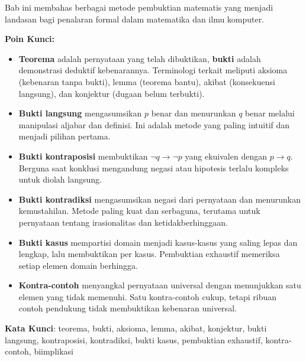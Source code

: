 \documentclass[../main]{subfiles}
\begin{document}
\begin{rangkuman}
Bab ini membahas berbagai metode pembuktian matematis yang menjadi landasan bagi penalaran formal dalam matematika dan ilmu komputer.

\textbf{Poin Kunci:}
\begin{itemize}
  \item \textbf{Teorema} adalah pernyataan yang telah dibuktikan, \textbf{bukti} adalah demonstrasi deduktif kebenarannya. Terminologi terkait meliputi aksioma (kebenaran tanpa bukti), lemma (teorema bantu), akibat (konsekuensi langsung), dan konjektur (dugaan belum terbukti).
  \item \textbf{Bukti langsung} mengasumsikan $p$ benar dan menurunkan $q$ benar melalui manipulasi aljabar dan definisi. Ini adalah metode yang paling intuitif dan menjadi pilihan pertama.
  \item \textbf{Bukti kontraposisi} membuktikan $\neg q \rightarrow \neg p$ yang ekuivalen dengan $p \rightarrow q$. Berguna saat konklusi mengandung negasi atau hipotesis terlalu kompleks untuk diolah langsung.
  \item \textbf{Bukti kontradiksi} mengasumsikan negasi dari pernyataan dan menurunkan kemustahilan. Metode paling kuat dan serbaguna, terutama untuk pernyataan tentang irasionalitas dan ketidakberhinggaan.
  \item \textbf{Bukti kasus} mempartisi domain menjadi kasus-kasus yang saling lepas dan lengkap, lalu membuktikan per kasus. Pembuktian exhaustif memeriksa setiap elemen domain berhingga.
  \item \textbf{Kontra-contoh} menyangkal pernyataan universal dengan menunjukkan satu elemen yang tidak memenuhi. Satu kontra-contoh cukup, tetapi ribuan contoh pendukung tidak membuktikan kebenaran universal.
\end{itemize}

\textbf{Kata Kunci}: teorema, bukti, aksioma, lemma, akibat, konjektur, bukti langsung, kontraposisi, kontradiksi, bukti kasus, pembuktian exhaustif, kontra-contoh, biimplikasi
\end{rangkuman}

\ifSubfilesClassLoaded{
  \renewcommand{\bibname}{Daftar Pustaka}
  
  
}{}
\end{document}
